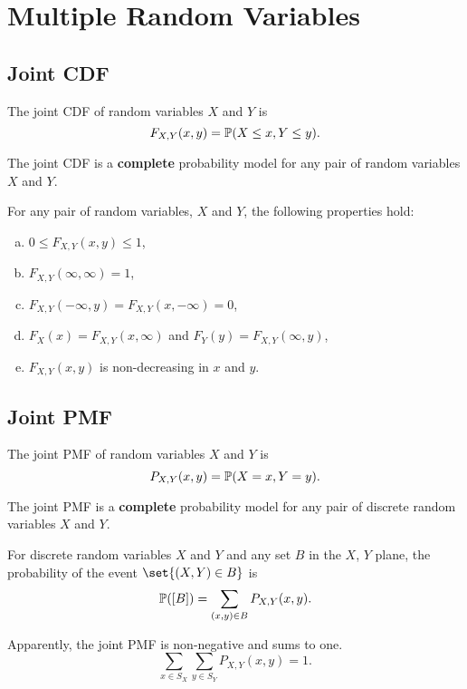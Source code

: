 \chapter{Multiple Random Variables}

\section{Joint CDF}
\begin{definition}
    The joint CDF of random variables $X$ and $Y$ is 
    \[F_{X,Y}(x,y) = \P{X\leq x, Y\leq y}.\]
\end{definition}

The joint CDF is a \textbf{complete} probability model for any pair of random variables $X$ and $Y$.

\begin{theorem}
    For any pair of random variables, $X$ and $Y$, the following properties hold:
    \begin{enumerate}[(a)]
        \item $0 \leq F_{X,Y}(x,y) \leq 1$,
        \item $F_{X,Y}(\infty,\infty)=1$,
        \item $F_{X,Y}(-\infty,y)=F_{X,Y}(x,-\infty)=0$,
        \item $F_X(x)=F_{X,Y}(x,\infty)$ and $F_Y(y)=F_{X,Y}(\infty,y)$,
        \item $F_{X,Y}(x,y)$ is non-decreasing in $x$ and $y$.
    \end{enumerate}
\end{theorem}

\section{Joint PMF}
\begin{definition}
    The joint PMF of random variables $X$ and $Y$ is 
    \[P_{X,Y}(x,y) = \P{X=x, Y=y}.\]    
\end{definition}

The joint PMF is a \textbf{complete} probability model for any pair of discrete random variables $X$ and $Y$.

\begin{theorem}
    For discrete random variables $X$ and $Y$ and any set $B$ in the $X$, $Y$ plane, the probability of the event $\set{(X,Y)\in B}$ is 
    \[\P{[B]}=\sum_{(x,y)\in B}P_{X,Y}(x,y).\]
\end{theorem}

Apparently, the joint PMF is non-negative and sums to one.
\[\sum_{x\in S_X}\sum_{y\in S_Y}P_{X,Y}(x,y)=1.\]

